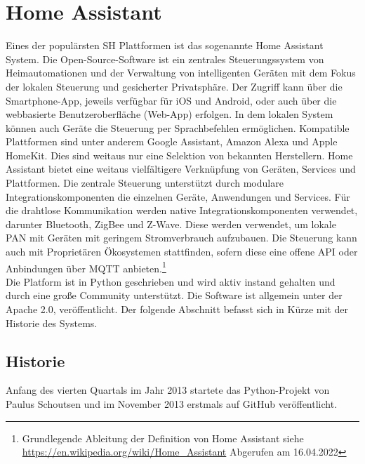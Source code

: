 \section{Home Assistant}
\label{sec:homeassistant}
    Eines der populärsten \acl{SH} Plattformen ist das sogenannte Home Assistant System. Die Open-Source-Software ist ein zentrales 
    Steuerungssystem von Heimautomationen und der Verwaltung von intelligenten Geräten mit dem Fokus der lokalen Steuerung und gesicherter 
    Privatsphäre. Der Zugriff kann über die Smartphone-App, jeweils verfügbar für iOS und Android, oder auch über die webbasierte 
    Benutzeroberfläche (Web-App) erfolgen. In dem lokalen System können auch Geräte die Steuerung per Sprachbefehlen ermöglichen. Kompatible 
    Plattformen sind unter anderem Google Assistant, Amazon Alexa und Apple HomeKit. Dies sind weitaus nur eine Selektion von bekannten 
    Herstellern. Home Assistant bietet eine weitaus vielfältigere Verknüpfung von Geräten, Services und Plattformen. Die zentrale Steuerung 
    unterstützt durch modulare Integrationskomponenten die einzelnen Geräte, Anwendungen und Services. Für die drahtlose Kommunikation 
    werden native Integrationskomponenten verwendet, darunter Bluetooth, ZigBee und Z-Wave. Diese werden verwendet, um lokale \ac{PAN} mit 
    Geräten mit geringem Stromverbrauch aufzubauen. Die Steuerung kann auch mit Proprietären Ökosystemen stattfinden, sofern diese eine offene 
    \acs{API} oder Anbindungen über \acs{MQTT} anbieten.\footnote{Grundlegende Ableitung der Definition von Home Assistant siehe \url{https://en.wikipedia.org/wiki/Home_Assistant} Abgerufen am 16.04.2022}
    \\
    Die Platform ist in Python geschrieben und wird aktiv instand gehalten und durch eine große Community unterstützt. Die Software ist allgemein unter 
    der Apache 2.0, veröffentlicht. Der folgende Abschnitt befasst sich in Kürze mit der Historie des Systems. 
    
    \subsection*{Historie}
    \label{sec:historyHOAS}
        Anfang des vierten Quartals im Jahr 2013 startete das Python-Projekt von Paulus Schoutsen und im November 2013 erstmals auf GitHub 
        veröffentlicht. %



